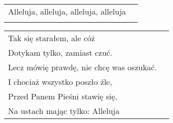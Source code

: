\documentclass[a5paper]{article}
\begin{document}
\noindent
\begin{tabular}{@{}p{8.5cm}p{3cm}@{}}
Alleluja, alleluja, alleluja, alleluja\\\\
\end{tabular}

\noindent
\begin{tabular}{@{}p{8.5cm}p{3cm}@{}}
Tak się starałem, ale cóż\\
Dotykam tylko, zamiast czuć.\\
Lecz mówię prawdę, nie chcę was oszukać.\\
I chociaż wszystko poszło źle, \\
Przed Panem Pieśni stawię się, \\
Na ustach mając tylko: Alleluja
\end{tabular}
\end{document}
